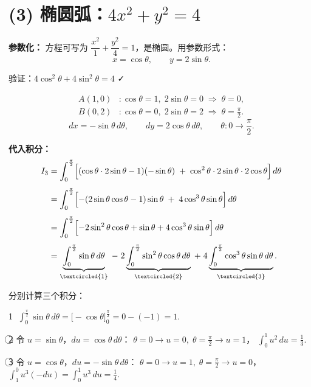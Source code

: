 \documentclass[12pt,a4paper]{ctexart}
\begin{document}
\section*{(3) 椭圆弧：$4x^2 + y^2 = 4$}

\medskip

\noindent\textbf{参数化：}
方程可写为 $\dfrac{x^2}{1} + \dfrac{y^2}{4} = 1$，是椭圆。用参数形式：
\[
x = \cos\theta,\qquad y = 2\sin\theta.
\]

验证：$4\cos^2\theta + 4\sin^2\theta = 4$ ✓

\[
\begin{aligned}
A(1,0) &: \cos\theta = 1,\; 2\sin\theta = 0 \;\Rightarrow\; \theta = 0,\\
B(0,2) &: \cos\theta = 0,\; 2\sin\theta = 2 \;\Rightarrow\; \theta = \frac{\pi}{2}.
\end{aligned}
\]
\[
dx = -\sin\theta\,d\theta,\qquad dy = 2\cos\theta\,d\theta,\qquad
\theta: 0 \to \frac{\pi}{2}.
\]

\noindent\textbf{代入积分：}
\[
\begin{aligned}
I_3 &= \int_0^{\frac{\pi}{2}}
      \Bigl[(\cos\theta \cdot 2\sin\theta - 1)(-\sin\theta)
      \;+\; \cos^2\theta \cdot 2\sin\theta \cdot 2\cos\theta\Bigr]\,d\theta \\[4pt]
    &= \int_0^{\frac{\pi}{2}}
      \Bigl[-(2\sin\theta\cos\theta - 1)\sin\theta
      \;+\; 4\cos^3\theta\sin\theta\Bigr]\,d\theta \\[4pt]
    &= \int_0^{\frac{\pi}{2}}
      \Bigl[-2\sin^2\theta\cos\theta + \sin\theta + 4\cos^3\theta\sin\theta\Bigr]\,d\theta \\[4pt]
    &= \underbrace{\int_0^{\frac{\pi}{2}}\sin\theta\,d\theta}_{\textcircled{1}}
       \;-\; 2\underbrace{\int_0^{\frac{\pi}{2}}\sin^2\theta\cos\theta\,d\theta}_{\textcircled{2}}
       \;+\; 4\underbrace{\int_0^{\frac{\pi}{2}}\cos^3\theta\sin\theta\,d\theta}_{\textcircled{3}}.
\end{aligned}
\]

分别计算三个积分：

\textcircled{1} $\displaystyle\int_0^{\frac{\pi}{2}}\sin\theta\,d\theta
                     = \bigl[-\cos\theta\bigr]_0^{\frac{\pi}{2}}
                     = 0 - (-1) = 1.$

\textcircled{2} 令 $u = \sin\theta$，$du = \cos\theta\,d\theta$：
   $\theta=0 \to u=0,\; \theta=\frac{\pi}{2} \to u=1$，
   $\displaystyle\int_0^1 u^2\,du = \frac{1}{3}.$

\textcircled{3} 令 $u = \cos\theta$，$du = -\sin\theta\,d\theta$：
   $\theta=0 \to u=1,\; \theta=\frac{\pi}{2} \to u=0$，
   $\displaystyle\int_1^0 u^3(-du) = \int_0^1 u^3\,du = \frac{1}{4}.$
\end{document}
